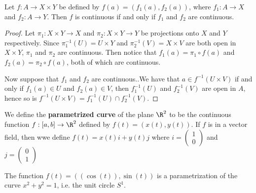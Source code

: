 \begin{theorem}\label{1.7.5}
    Let $f:A \rightarrow X \times Y$ be defined by  $f(a)=(f_1(a),f_2(a))$, where $ f_1:A
    \rightarrow X$ and $ f_2: A \rightarrow Y$. Then $f$ is continuous if and only if  $ f_1$ and $
    f_2$ are continuous.
\end{theorem}
\begin{proof}
    Let $\pi_1:X \times Y \rightarrow X$ and $\pi_2:X \times Y \rightarrow Y$ be projections onto
    $X$ and  $Y$ respectively. Since  $\pi_1^{-1}(U)=U \times Y$ and $\pi_2^{-1}(V)=X \times V$ are
    both open in  $X \times Y$,  $\pi_1$ and $\pi_2$ are continuous. Then notice that $ f_1(a)=\pi_1
    \circ f(a)$ and $ f_2(a)=\pi_2 \circ f(a)$, both of which are continuous.

    Now suppose that $ f_1$ and $ f_2$ are continuous..We have that $a \in f^{-1}(U \times V)$ if
    and only if $f_1(a) \in U$ and $ f_2(a) \in V$, then $ f_1^{-1}(U)$ and $f_2^{-1}(V)$ are open
    in $A$, hence so is $f^{-1}(U \times V)=f_1^{-1}(U) \cap f_2^{-1}(V)$.
\end{proof}

\begin{definition}
    We define the \textbf{parametrized curve} of the plane $\R^2$ to be the continuous function
    $f:[a,b] \rightarrow \R^2$ defined by $f(t)=(x(t),y(t))$. If $f$ is in a vector field, then wwe
    define $f(t)=x(t)i+y(t)j$ where $i=
    \begin{pmatrix}
        1 \\
        0
    \end{pmatrix}$
    and $j=
    \begin{pmatrix}
        0 \\
        1
    \end{pmatrix}$
\end{definition}

\begin{example}
    The function $f(t)=((\cos(t)),\sin(t))$ is a parametrization of the curve $x^2+y^2=1$, i.e. the
    unit circle  $S^1$.
\end{example}
